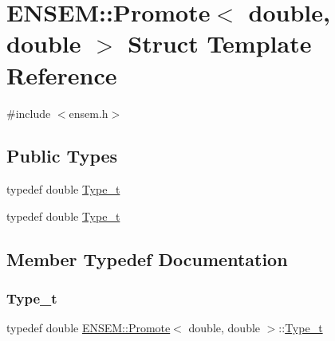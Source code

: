 \hypertarget{structENSEM_1_1Promote_3_01double_00_01double_01_4}{}\section{E\+N\+S\+EM\+:\+:Promote$<$ double, double $>$ Struct Template Reference}
\label{structENSEM_1_1Promote_3_01double_00_01double_01_4}


{\ttfamily \#include $<$ensem.\+h$>$}

\subsection*{Public Types}
\begin{DoxyCompactItemize}
\item 
typedef double \mbox{\hyperlink{structENSEM_1_1Promote_3_01double_00_01double_01_4_a24ebc4a5bef63c7bb489c2cf17b184ab}{Type\+\_\+t}}
\item 
typedef double \mbox{\hyperlink{structENSEM_1_1Promote_3_01double_00_01double_01_4_a24ebc4a5bef63c7bb489c2cf17b184ab}{Type\+\_\+t}}
\end{DoxyCompactItemize}


\subsection{Member Typedef Documentation}
\mbox{\label{structENSEM_1_1Promote_3_01double_00_01double_01_4_a24ebc4a5bef63c7bb489c2cf17b184ab}} 
\subsubsection{\texorpdfstring{Type\_t}{Type\_t}\hspace{0.1cm}{\footnotesize\ttfamily [1/2]}}
{\footnotesize\ttfamily typedef double \mbox{\hyperlink{structENSEM_1_1Promote}{E\+N\+S\+E\+M\+::\+Promote}}$<$ double, double $>$\+::\mbox{\hyperlink{structENSEM_1_1Promote_3_01double_00_01double_01_4_a24ebc4a5bef63c7bb489c2cf17b184ab}{Type\+\_\+t}}}

\mbox{\label{structENSEM_1_1Promote_3_01double_00_01double_01_4_a24ebc4a5bef63c7bb489c2cf17b184ab}} 
